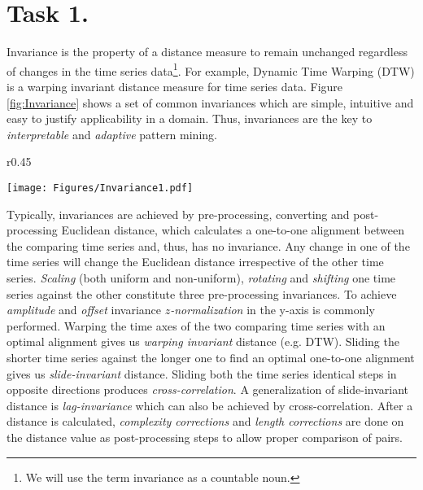 

\section{Task 1. \Tthree}

Invariance is the property of a distance measure to remain unchanged regardless of changes in the time series data\footnote{We will use the term invariance as a countable noun.}. For example, Dynamic Time Warping (DTW) is a warping invariant distance measure for time series data. Figure \ref{fig:Invariance} shows a set of common invariances which are simple, intuitive and easy to justify applicability in a domain. Thus, invariances are the key to {\it interpretable} and {\it adaptive} pattern mining.

\begin{wrapfigure}{r}{0.45\textwidth}
\vspace{-0.9cm}
\begin{center}
\texttt{[image: Figures/Invariance1.pdf]}
\caption{Invariances applied to the red sine wave to make it identical to the blue sine wave. Computation cost of each invariance is mentioned. The better of the pairs is checked.}
\label{fig:Invariance}
\end{center}
\vspace{-.7cm}
\end{wrapfigure}

Typically, invariances are achieved by pre-processing, converting and post-processing Euclidean distance, which calculates a one-to-one alignment between the comparing time series and, thus, has no invariance. Any change in one of the time series will change the Euclidean distance irrespective of the other time series.
{\it Scaling} (both uniform and non-uniform), {\it rotating} and {\it shifting} one time series against the other constitute three pre-processing invariances. To achieve {\it amplitude} and {\it offset} invariance {\it $z$-normalization} in the y-axis is commonly performed. Warping the time axes of the two comparing time series with an optimal alignment gives us {\it warping invariant} distance (e.g. DTW). Sliding the shorter time series against the longer one to find an optimal one-to-one alignment gives us {\it slide-invariant} distance. Sliding both the time series identical steps in opposite directions produces {\it cross-correlation}. A generalization of slide-invariant distance is {\it lag-invariance} which can also be achieved by cross-correlation. After a distance is calculated, {\it complexity corrections} and {\it length corrections} are done on the distance value as post-processing steps to allow proper comparison of pairs.


